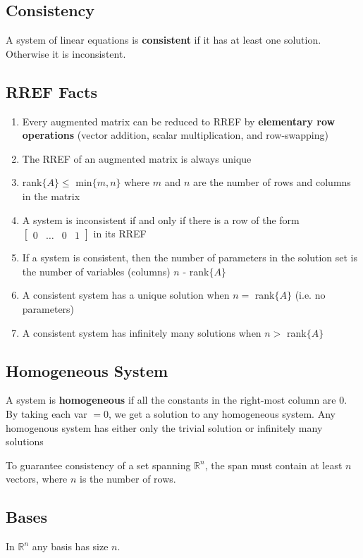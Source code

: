 \documentclass[12pt]{article}
\newcommand{\R}[1]{\mathbb{R}^{#1}}
\begin{document}
\subsection*{Consistency}
A system of linear equations is {\bf consistent} if it has at least one solution. Otherwise it is inconsistent.

\subsection*{RREF Facts}
\begin{enumerate}
\item Every augmented matrix can be reduced to RREF by {\bf elementary row operations} (vector addition, scalar multiplication, and row-swapping)
\item The RREF of an augmented matrix is always unique
\item rank$\{A\} \leq$ min$\{m,n\}$ where $m$ and $n$ are the number of rows and columns in the matrix
\item A system is inconsistent if and only if there is a row of the form $\begin{bmatrix}0&\dots&0&1\end{bmatrix}$ in its RREF
\item If a system is consistent, then the number of parameters in the solution set is the number of variables (columns) $n$ - rank$\{A\}$
\item A consistent system has a unique solution when $n =$ rank$\{A\}$ (i.e. no parameters)
\item A consistent system has infinitely many solutions when $n >$ rank$\{A\}$
\end{enumerate}

\subsection*{Homogeneous System}
A system is {\bf homogeneous} if all the constants in the right-most column are 0. By taking each var $= 0$, we get a solution to any homogeneous system. Any homogenous system has either only the trivial solution or infinitely many solutions

To guarantee consistency of a set spanning $\R{n}$, the span must contain at least $n$ vectors, where $n$ is the number of rows.

\subsection*{Bases}
In $\R{n}$ any basis has size $n$.
\end{document}
